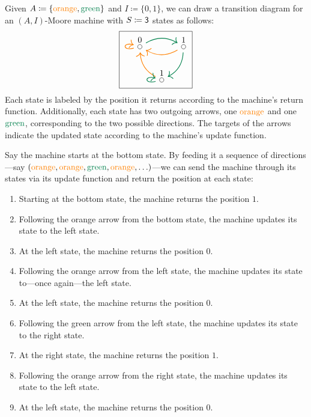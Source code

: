 \documentclass[Book-Poly]{subfiles}
\begin{document}
\begin{example}\label{ex.Moore_three}
Given $A\coloneqq\{{\color{orange}\text{orange}},{\color{dgreen}\text{green}}\}$ and $I\coloneqq\{0,1\}$, we can draw a transition diagram for an $(A,I)$-Moore machine with $S\coloneqq\textsf{3}$ states as follows:
\begin{equation} \label{eqn.trans_diag}
\begin{tikzpicture}
	\node[draw] {
  \begin{tikzcd}[column sep=small]
  	\LMO{0}\ar[rr, dgreen, thick, bend left]\ar[loop left, thick, orange]&&
  	\LMO{1}\ar[ll, thick, orange, bend left]\ar[dl, bend left, thick, dgreen]\\&
  	\LMO{1} \ar[ul, thick, orange, bend left] \ar[loop left, thick, dgreen]
  \end{tikzcd}
  };
\end{tikzpicture}
\end{equation}
Each state is labeled by the position it returns according to the machine's return function.
Additionally, each state has two outgoing arrows, one ${\color{orange}\text{orange}}$ and one ${\color{dgreen}\text{green}}$, corresponding to the two possible directions.
The targets of the arrows indicate the updated state according to the machine's update function.

Say the machine starts at the bottom state.
By feeding it a sequence of directions---say $({\color{orange}\text{orange}}, {\color{orange}\text{orange}}, {\color{dgreen}\text{green}}, {\color{orange}\text{orange}},\ldots)$---we can send the machine through its states via its update function and return the position at each state:
\begin{enumerate}
    \item Starting at the bottom state, the machine returns the position $1$.
    \item Following the {\color{orange}orange} arrow from the bottom state, the machine updates its state to the left state.
    \item At the left state, the machine returns the position $0$.
    \item Following the {\color{orange}orange} arrow from the left state, the machine updates its state to---once again---the left state.
    \item At the left state, the machine returns the position $0$.
    \item Following the {\color{dgreen}green} arrow from the left state, the machine updates its state to the right state.
    \item At the right state, the machine returns the position $1$.
    \item Following the {\color{orange}orange} arrow from the right state, the machine updates its state to the left state.
    \item At the left state, the machine returns the position $0$.


\end{enumerate}
\end{example}
\end{document}
